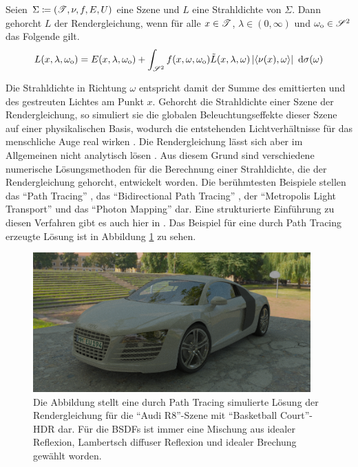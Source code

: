 		\begin{definition}[Rendergleichung]
			Seien $\Sigma\coloneqq (\mathscr{T},\nu,f,E,U)$ eine Szene und $L$ eine Strahldichte von $\Sigma$.
			Dann gehorcht $L$ der Rendergleichung, wenn für alle $x\in\mathscr{T}$, $\lambda\in(0,\infty)$ und $\omega_{\mathrm{o}}\in\mathscr{S}^{2}$ das Folgende gilt.
			\[
				L(x,\lambda,\omega_{\mathrm{o}}) = E(x,\lambda,\omega_{\mathrm{o}}) + \int_{\mathscr{S}^{2}}^{}  f(x,\omega,\omega_{\mathrm{o}})\tilde{L}(x,\lambda,\omega) \left\vert \left\langle \nu(x),\omega \right\rangle \right\vert \ \mathrm{d} \sigma(\omega)
			\]
		\end{definition}

		Die Strahldichte in Richtung $\omega$ entspricht damit der Summe des emittierten und des gestreuten Lichtes am Punkt $x$.
		Gehorcht die Strahldichte einer Szene der Rendergleichung, so simuliert sie die globalen Beleuchtungseffekte dieser Szene auf einer physikalischen Basis, wodurch die entstehenden Lichtverhältnisse für das menschliche Auge real wirken \cite{kajiya-lte,pbrt3,veach-thesis}.
		Die Rendergleichung lässt sich aber im Allgemeinen nicht analytisch lösen \cite{pbrt3,veach-thesis,kajiya-lte}.
		Aus diesem Grund sind verschiedene numerische Lösungsmethoden für die Berechnung einer Strahldichte, die der Rendergleichung gehorcht, entwickelt worden.
		Die berühmtesten Beispiele stellen das \enquote{Path Tracing} \cite{kajiya-lte}, das \enquote{Bidirectional Path Tracing} \cite{bidirectional-path-tracing}, der \enquote{Metropolis Light Transport} \cite{veach-mlt} und das \enquote{Photon Mapping} \cite{course-photon-map} dar.
		Eine strukturierte Einführung zu diesen Verfahren gibt es auch hier in \cite{pbrt3}.
		Das Beispiel für eine durch Path Tracing erzeugte Lösung ist in Abbildung \ref{fig:example-audi-r8-pt} zu sehen.

		\begin{figure}
			\center
			\includegraphics[width=0.95\textwidth]{pic/example-audi_r8-pt.png}
			\caption[Path Tracing am Beispiel der \enquote{Audi R8}-Szene mit \enquote{Basketball Court}-HDR]{Die Abbildung stellt eine durch Path Tracing simulierte Lösung der Rendergleichung für die \enquote{Audi R8}-Szene mit \enquote{Basketball Court}-HDR dar. Für die BSDFs ist immer eine Mischung aus idealer Reflexion, Lambertsch diffuser Reflexion und idealer Brechung gewählt worden.}
			\label{fig:example-audi-r8-pt}
		\end{figure}

